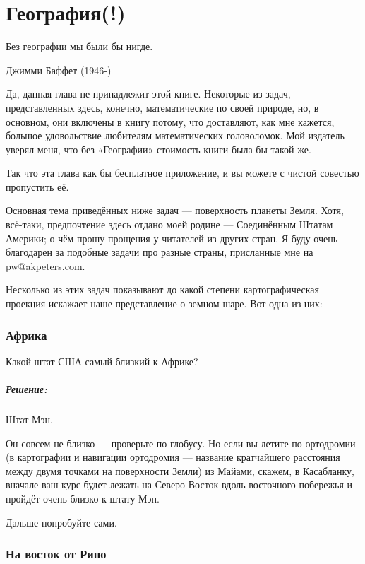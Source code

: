\chapter*{География(!)}

\epigraph{Без географии мы были бы нигде.}{Джимми Баффет (1946-)}%

Да, данная глава не принадлежит этой книге. %
Некоторые из задач, представленных здесь, конечно, математические по своей природе, %
но, в основном, они включены в книгу потому, что доставляют, как мне кажется, большое удовольствие любителям математических головоломок.
Мой издатель уверял меня, что без «Географии» стоимость книги была бы такой же.

Так что эта глава как бы бесплатное приложение, и вы можете с чистой совестью пропустить её.

Основная тема приведённых ниже задач --- поверхность планеты Земля.
Хотя, всё-таки, предпочтение здесь отдано моей родине --- Соединённым Штатам Америки; о чём прошу прощения у читателей из других стран.
Я буду очень благодарен за подобные задачи про разные страны, присланные мне на pw@akpeters.com.

Несколько из этих задач показывают до какой степени %
картографическая проекция %
искажает наше представление о земном шаре. %
Вот одна из них: 

\subsection*{Африка} 

Какой штат США самый близкий к Африке? 

\paragraph{Решение:} Штат Мэн.\heart
  
Он совсем не близко --- проверьте по глобусу.
Но если вы летите по ортодромии (в картографии и навигации ортодромия --- название кратчайшего расстояния между двумя точками на поверхности Земли) из Майами, скажем, в Касабланку, вначале ваш курс %
будет лежать на Северо-Восток вдоль восточного побережья и пройдёт очень близко к штату Мэн.

\medskip

Дальше попробуйте сами.

\subsection*{На восток от Рино}%

